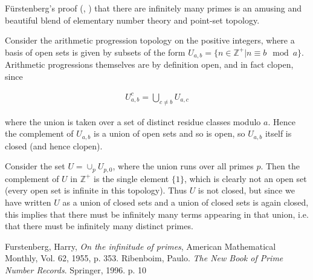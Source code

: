 \documentclass[12pt]{article}
\newcommand{\mb}{\mathbb}
\newcommand{\Z}{\mb{Z}}
\newcommand{\<}{\langle}
\renewcommand{\>}{\rangle}
\begin{document}
F\"urstenberg's proof (\cite{fberg}, \cite{priben}) that there are infinitely many primes is an amusing and beautiful blend of elementary number theory and point-set topology.

Consider the arithmetic progression topology on the positive integers, where a basis of open sets is given by subsets of the form $U_{a,b}=\{n\in\Z^+|n\equiv b\mod a\}$.  Arithmetic progressions themselves are by definition open, and in fact clopen, since

\begin{align*}
U_{a,b}^c=\bigcup_{c\neq b} U_{a,c}
\end{align*}

where the union is taken over a set of distinct residue classes modulo $a$.  Hence the complement of $U_{a,b}$ is a union of open sets and so is open, so $U_{a,b}$ itself is closed (and hence clopen).

Consider the set $U=\cup_p U_{p,0}$, where the union runs over all primes $p$.  Then the complement of $U$ in $\Z^+$ is the single element $\{1\}$, which is clearly not an open set (every open set is infinite in this topology).  Thus $U$ is not closed, but since we have written $U$ as a union of closed sets and a \emph{} union of closed sets is again closed, this implies that there must be infinitely many terms appearing in that union, i.e. that there must be infinitely many distinct primes.

\begin{thebibliography}{9}
Furstenberg, Harry, 
\emph{On the infinitude of primes}, 
American Mathematical Monthly, Vol. 62, 1955, p. 353. 
Ribenboim, Paulo.  \emph{The New Book of Prime Number Records}.  Springer, 1996.  p. 10
\end{thebibliography}
\end{document}
